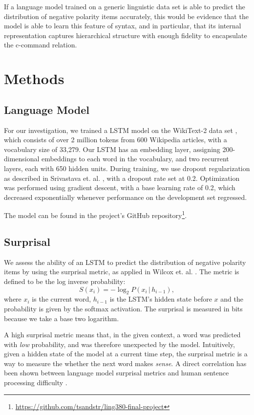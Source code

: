 \documentclass[11pt, round]{article}
\begin{document}
If a language model trained on a generic linguistic data set is able to predict the distribution of negative polarity items accurately, this would be evidence that the model is able to learn this feature of syntax, and in particular, that its internal representation captures hierarchical structure with enough fidelity to encapsulate the c-command relation.

\section{Methods}

\subsection{Language Model}

For our investigation, we trained a LSTM model on the WikiText-2 data set \cite{merity2016pointer}, which consists of over 2 million tokens from 600 Wikipedia articles, with a vocabulary size of 33,279. Our LSTM has an embedding layer, assigning 200-dimensional embeddings to each word in the vocabulary, and two recurrent layers, each with 650 hidden units. During training, we use dropout regularization as described in Srivastava et. al. , with a dropout rate set at 0.2. Optimization was performed using gradient descent, with a base learning rate of 0.2, which decreased exponentially whenever performance on the development set regressed.

The model can be found in the project's GitHub repository\footnote{\url{https://github.com/tsandstr/ling380-final-project}}.

\subsection{Surprisal}
\label{sec:surpisal}

We assess the ability of an LSTM to predict the distribution of negative polarity items by using the surprisal metric, as applied in Wilcox et. al. . The metric is defined to be the log inverse probability:
\[ S(x_i) = -\log_2 P(x_i \, | \, h_{i-1}), \]
where $x_i$ is the current word, $h_{i-1}$ is the LSTM's hidden state before $x$ and the probability is given by the softmax activation. The surprisal is measured in bits because we take a base two logarithm.

A high surprisal metric means that, in the given context, a word was predicted with \textit{low} probability, and was therefore unexpected by the model. Intuitively, given a hidden state of the model at a current time step, the surprisal metric is a way to measure the whether the next word makes \textit{sense}. A direct correlation has been shown between language model surprisal metrics and  human sentence processing difficulty \cite{hale2001probabilistic,levy2008expectation,smith2013effect}. 
\end{document}
